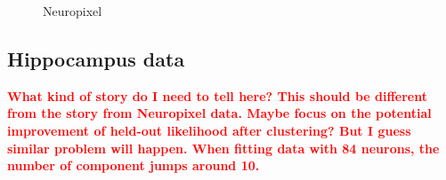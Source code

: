 \documentclass{article}
\begin{document}
\begin{figure}[h!]
		
		\caption{Neuropixel}
	\end{figure}
	
	\subsection{Hippocampus data}
	
	\textcolor{red}{\textbf{What kind of story do I need to tell here? This should be different from the story from Neuropixel data. Maybe focus on the potential improvement of held-out likelihood after clustering? But I guess similar problem will happen. When fitting data with 84 neurons, the number of component jumps around 10.}}
	
\end{document}
